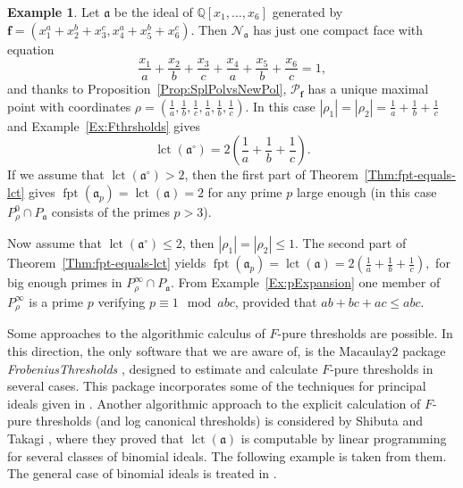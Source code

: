 \documentclass[12pt]{amsart}
\theoremstyle{definition}
\newtheorem{example}[theorem]{Example}
\numberwithin{equation}{subsection}
\DeclareMathOperator{\fpt}{fpt}
\newcommand{\lct}{{\operatorname{lct}}}
\newcommand{\QQ}{\mathbb{Q}}
\newcommand{\fa}{\mathfrak{a}}
\newcommand{\SP}{\mathcal{P}}
\newcommand{\N}{\mathcal{N}}
\newcommand{\Bf}{\boldsymbol{f}}
\renewcommand{\!}[1]{{\color{red}\text{\Huge$\star$ }#1}}
\begin{document}
\begin{example}\label{Ex:CondPrimes}
	Let $\fa$ be the ideal of $\QQ[x_1,\ldots,x_6]$ generated by $\Bf=(x_1^{a}+x_2^{b}+x_3^{c},x_4^{a}+x_5^{b}+x_6^{c})$. Then
	$\N_{\fa}$ has just one compact face with equation 
	\[\frac{x_1}{a}+\frac{x_2}{b}+\frac{x_3}{c}+\frac{x_4}{a}+\frac{x_5}{b}+\frac{x_6}{c}=1,
	\]
	and thanks to Proposition~\ref{Prop:SplPolvsNewPol}, $\SP_{\Bf}$ has a unique maximal point with coordinates $\rho=(\frac{1}{a},\frac{1}{b},\frac{1}{c},\frac{1}{a},\frac{1}{b},\frac{1}{c})$. In this case $|\rho_1|=|\rho_2|=\frac{1}{a}+\frac{1}{b}+\frac{1}{c}$ and Example~\ref{Ex:Fthrsholds} gives 
	\[\lct(\fa^\circ)=2\left(\frac{1}{a}+\frac{1}{b}+\frac{1}{c}\right).
	\]
	If we assume that $\lct(\fa^\circ)>2$, then the first part of Theorem~\ref{Thm:fpt-equals-lct} gives $\fpt(\fa_p)=\lct(\fa)=2$ for any prime $p$ large enough (in this case $P_\rho^0\cap P_\fa$ consists of the primes $p>3$).
	
	Now assume that $\lct(\fa^\circ)\leq 2$, then $|\rho_1|=|\rho_2|\leq 1$. The second part of Theorem~\ref{Thm:fpt-equals-lct} yields 
	$\fpt(\fa_p)=\lct(\fa)=2\left(\frac{1}{a}+\frac{1}{b}+\frac{1}{c}\right),$ for big enough primes in $P_\rho^\infty\cap P_\fa$. From Example~\ref{Ex:pExpansion} one member of $P_\rho^\infty$ is a prime $p$ verifying $p \equiv 1 \mod abc$, provided that $ab+bc+ac\leq abc$.
	
\end{example}

Some approaches to the algorithmic calculus of $F$-pure thresholds are possible. In this direction, the only software that we are aware of, is the  $\mathrm{Macaulay2}$ package \textit{FrobeniusThresholds} \cite{MacFrobThre}, designed to estimate and calculate $F$-pure thresholds in several cases. This package incorporates some of the techniques for principal ideals given in \cite{HDbinomial,HDdiagonal,HDpolynomials}. 
Another algorithmic approach to the explicit calculation of $F$-pure thresholds (and log canonical thresholds) is considered by Shibuta and Takagi \cite{ShTa}, where they proved that $\lct(\fa)$ is computable by linear programming for several classes of binomial ideals. The following example is taken from them. The general case of binomial ideals is treated in \cite{BlaEn}.
\end{document}
